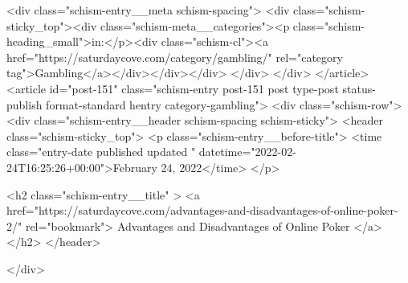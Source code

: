 {		<div class="schism-entry__meta schism-spacing">			<div class="schism-sticky_top"><div class="schism-meta__categories"><p class="schism-heading_small">in:</p><div class="schism-cl"><a href="https://saturdaycove.com/category/gambling/" rel="category tag">Gambling</a></div></div></div>		</div>
	</div>
</article>
<article id="post-151" class="schism-entry post-151 post type-post status-publish format-standard hentry category-gambling">
	<div class="schism-row">		<div class="schism-entry__header schism-spacing schism-sticky">			<header class="schism-sticky_top">				<p class="schism-entry__before-title">
					<time class="entry-date published updated " datetime="2022-02-24T16:25:26+00:00">February 24, 2022</time>				</p>

				<h2 class="schism-entry__title" >
					<a href="https://saturdaycove.com/advantages-and-disadvantages-of-online-poker-2/" rel="bookmark">
						Advantages and Disadvantages of Online Poker					</a>
				</h2>
			</header>

					</div>

}
